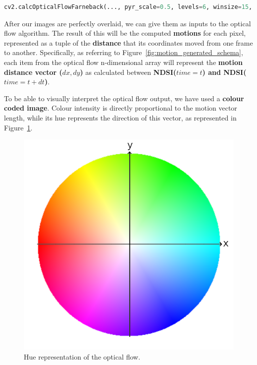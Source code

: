 \documentclass[12pt, a4paper]{report}
\begin{document}
	\begin{lstlisting}[caption={Optical flow parameters},label={lst:opticalparameters},language=Python]
		cv2.calcOpticalFlowFarneback(..., pyr_scale=0.5, levels=6, winsize=15, iterations=3, poly_n=5, poly_sigma=1.2, flags=0)
	\end{lstlisting}

	\par After our images are perfectly overlaid, we can give them as inputs to the optical flow algorithm. The result of this will be the computed \textbf{motions} for each pixel, represented as a tuple of the \textbf{distance} that its coordinates moved from one frame to another. Specifically, as referring to Figure~\ref{fig:motion_generated_schema}, each item from the optical flow n-dimensional array will represent the \textbf{motion distance vector (\(dx, dy\))} as calculated between \textbf{NDSI(\(time=t\)) and NDSI(\(time=t + dt\))}.
	
	\par To be able to visually interpret the optical flow output, we have used a \textbf{colour coded image}. Colour intensity is directly proportional to the motion vector length, while its hue represents the direction of this vector, as represented in Figure~\ref{fig:hue_colour_wheel}.
	
	\begin{figure}[h!]
		\centering
		\includegraphics[scale=0.3]{../images/colorwheel.png}
		\caption{Hue representation of the optical flow.}
		\label{fig:hue_colour_wheel}
	\end{figure}
	
\end{document}
